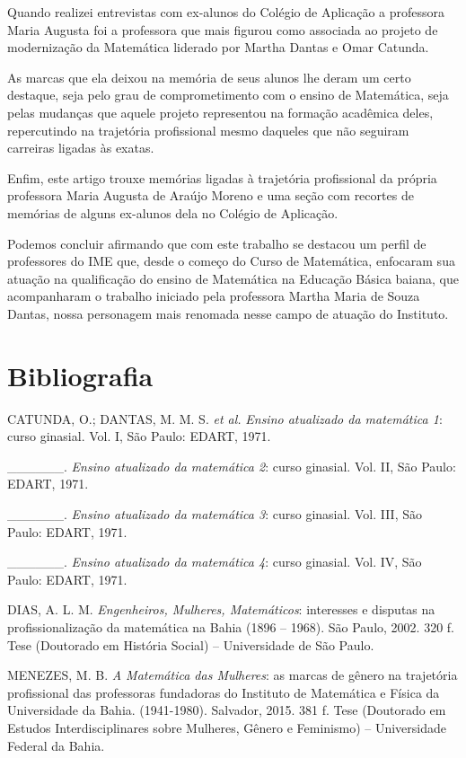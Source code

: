 \documentclass{hipatia}
\begin{document}
\upshape

\sepdecorada

Quando realizei entrevistas com ex-alunos do Colégio de Aplicação a
professora Maria Augusta foi a professora que mais figurou como
associada ao projeto de modernização da Matemática liderado por Martha
Dantas e Omar Catunda.

As marcas que ela deixou na memória de seus alunos lhe deram um certo
destaque, seja pelo grau de comprometimento com o ensino de Matemática,
seja pelas mudanças que aquele projeto representou na formação acadêmica
deles, repercutindo na trajetória profissional mesmo daqueles que não
seguiram carreiras ligadas às exatas.

Enfim, este artigo trouxe memórias ligadas à trajetória profissional da
própria professora Maria Augusta de Araújo Moreno e uma seção com
recortes de memórias de alguns ex-alunos dela no Colégio de Aplicação.

Podemos concluir afirmando que com este trabalho se destacou um perfil
de professores do IME que, desde o começo do Curso de Matemática,
enfocaram sua atuação na qualificação do ensino de Matemática na Educação
Básica baiana, que acompanharam o trabalho iniciado pela professora
Martha Maria de Souza Dantas, nossa personagem mais renomada nesse campo
de atuação do Instituto.

\section{Bibliografia}

CATUNDA, O.; DANTAS, M. M. S. \emph{et al.} \emph{Ensino atualizado da
matemática 1}: curso ginasial. Vol. I, São Paulo: EDART, 1971.

\_\_\_\_\_\_. \emph{Ensino atualizado da matemática 2}: curso
ginasial. Vol. II, São Paulo: EDART, 1971.

\_\_\_\_\_\_. \emph{Ensino atualizado da matemática 3}: curso
ginasial. Vol. III, São Paulo: EDART, 1971.

\_\_\_\_\_\_. \emph{Ensino atualizado da matemática 4}: curso
ginasial. Vol. IV, São Paulo: EDART, 1971.

DIAS, A. L. M. \emph{Engenheiros, Mulheres, Matemáticos}: interesses e
disputas na profissionalização da matemática na Bahia (1896 -- 1968).
São Paulo, 2002. 320 f. Tese (Doutorado em História Social) --
Universidade de São Paulo.

MENEZES, M. B. \emph{A Matemática das Mulheres}: as marcas de gênero
na trajetória profissional das professoras fundadoras do Instituto de
Matemática e Física da Universidade da Bahia. (1941-1980). Salvador,
2015. 381 f. Tese (Doutorado em Estudos Interdisciplinares sobre
Mulheres, Gênero e Feminismo) -- Universidade Federal da Bahia.
\end{document}
